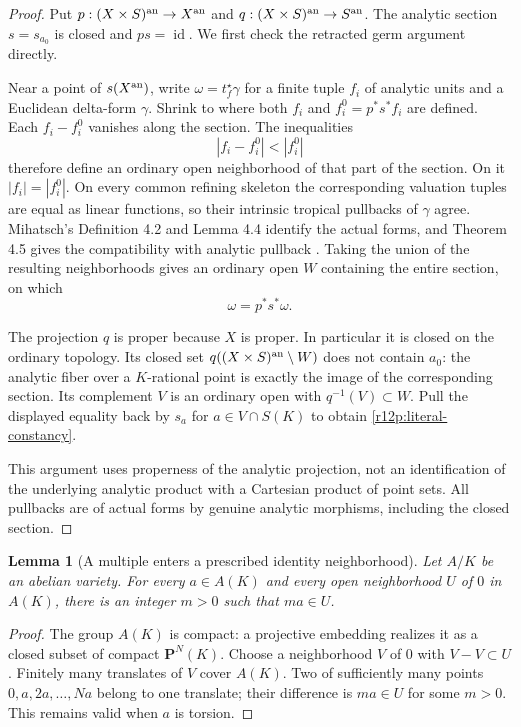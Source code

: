 \documentclass[11pt]{article}
\newtheorem{lemma}[theorem]{Lemma}
\theoremstyle{definition}
\theoremstyle{remark}
\numberwithin{equation}{section}
\begin{document}
\begin{proof}
Put $p:(X\times S)^{\rm an}\to X^{\rm an}$ and
$q:(X\times S)^{\rm an}\to S^{\rm an}$.  The analytic section
$s=s_{a_0}$ is closed and $ps=\operatorname{id}$.  We first check
the retracted germ argument directly.

Near a point of $s(X^{\rm an})$, write
$\omega=t_f^\star\gamma$ for a finite tuple $f_i$ of analytic units
and a Euclidean delta-form $\gamma$.  Shrink to where both $f_i$ and
$f_i^0=p^*s^*f_i$ are defined.  Each $f_i-f_i^0$ vanishes along the
section.  The inequalities
\[
                         |f_i-f_i^0|<|f_i^0|
\]
therefore define an ordinary open neighborhood of that part of the
section.  On it $|f_i|=|f_i^0|$.  On every common refining skeleton
the corresponding valuation tuples are equal as linear functions,
so their intrinsic tropical pullbacks of $\gamma$ agree.  Mihatsch's
Definition 4.2 and Lemma 4.4 identify the actual forms, and Theorem 4.5
gives the compatibility with analytic pullback \cite{M}.  Taking the
union of the resulting neighborhoods gives an ordinary open $W$
containing the entire section, on which
\[
                         \omega=p^*s^*\omega.
\]

The projection $q$ is proper because $X$ is proper.  In particular it
is closed on the ordinary topology.  Its closed set
$q((X\times S)^{\rm an}\setminus W)$ does not contain $a_0$:
the analytic fiber over a $K$-rational point is exactly the image of
the corresponding section.  Its complement $V$ is an ordinary open
with $q^{-1}(V)\subset W$.  Pull the displayed equality back by
$s_a$ for $a\in V\cap S(K)$ to obtain
\eqref{r12p:literal-constancy}.

This argument uses properness of the analytic projection, not an
identification of the underlying analytic product with a Cartesian
product of point sets.  All pullbacks are of actual forms by genuine
analytic morphisms, including the closed section.
\end{proof}

\begin{lemma}[A multiple enters a prescribed identity neighborhood]
\label{r12p:compact-multiple}
Let $A/K$ be an abelian variety.  For every $a\in A(K)$ and every
open neighborhood $U$ of $0$ in $A(K)$, there is an integer $m>0$
such that $ma\in U$.
\end{lemma}

\begin{proof}
The group $A(K)$ is compact: a projective embedding realizes it as
a closed subset of compact $\mathbf P^N(K)$.  Choose a neighborhood
$V$ of $0$ with $V-V\subset U$.  Finitely many translates of $V$
cover $A(K)$.  Two of sufficiently many points $0,a,2a,\ldots,Na$
belong to one translate; their difference is $ma\in U$ for some
$m>0$.  This remains valid when $a$ is torsion.
\end{proof}
\end{document}
